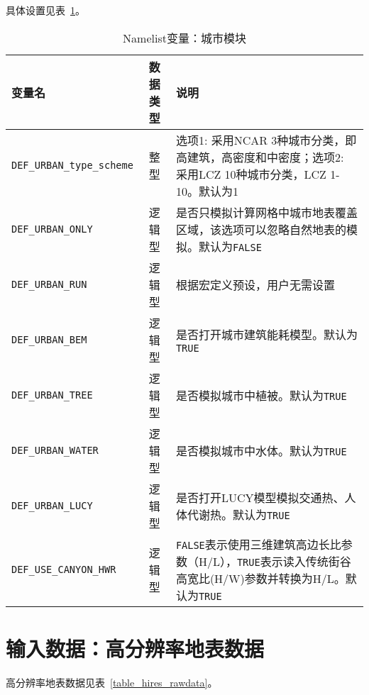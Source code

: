具体设置见表~\ref{table_nl_urban}。
\begin{table}[!htb] \small
\caption{Namelist变量：城市模块}
\label{table_nl_urban}
\centering \renewcommand{\arraystretch}{1.5}
\begin{tabular}{lcp{}}
\toprule
\textbf{变量名} & \textbf{数据类型} & \textbf{说明}\\\midrule
\texttt{DEF\_URBAN\_type\_scheme} & 整型 & 选项1: 采用NCAR 3种城市分类，即高建筑，高密度和中密度；选项2: 采用LCZ 10种城市分类，LCZ 1-10。默认为1\\
\texttt{DEF\_URBAN\_ONLY} & 逻辑型 & 是否只模拟计算网格中城市地表覆盖区域，该选项可以忽略自然地表的模拟。默认为\texttt{FALSE}\\
\texttt{DEF\_URBAN\_RUN} & 逻辑型 & 根据宏定义预设，用户无需设置\\
\texttt{DEF\_URBAN\_BEM} & 逻辑型 & 是否打开城市建筑能耗模型。默认为\texttt{TRUE}\\
\texttt{DEF\_URBAN\_TREE} & 逻辑型 & 是否模拟城市中植被。默认为\texttt{TRUE}\\
\texttt{DEF\_URBAN\_WATER} & 逻辑型 & 是否模拟城市中水体。默认为\texttt{TRUE}\\
\texttt{DEF\_URBAN\_LUCY} & 逻辑型 & 是否打开LUCY模型模拟交通热、人体代谢热。默认为\texttt{TRUE}\\
\texttt{DEF\_USE\_CANYON\_HWR} & 逻辑型 & \texttt{FALSE}表示使用三维建筑高边长比参数（H/L），\texttt{TRUE}表示读入传统街谷高宽比(H/W)参数并转换为H/L。默认为\texttt{TRUE} \\
\bottomrule
\end{tabular}
\end{table}
\clearpage

\section{输入数据：高分辨率地表数据} \label{landdata}

高分辨率地表数据见表~\ref{table_hires_rawdata}。

